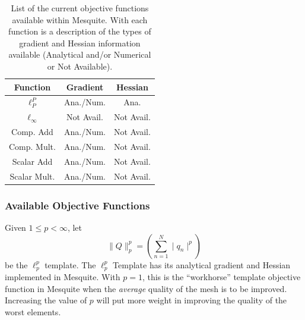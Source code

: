 \begin{table}[htb]
\begin{center}
\begin{tabular}{|c|c|c|}
\hline
Function & Gradient & Hessian\\
\hline
$\ell_P^P$     & Ana./Num.&Ana.\\
$\ell_{\infty}$& Not Avail.& Not Avail.\\
Comp. Add      & Ana./Num.& Not Avail.\\
Comp. Mult.    & Ana./Num.& Not Avail.\\
Scalar Add     & Ana./Num.& Not Avail.\\
Scalar Mult.   & Ana./Num.& Not Avail.\\
\hline
\end{tabular}
\caption{List of the current objective functions available within
Mesquite.  With each function is a description of the types of
gradient and Hessian information available (Analytical and/or Numerical
or Not Available).}
\label{current-objfunc}
\end{center}
\end{table}

\subsubsection{Available Objective Functions}


 \newline
Given $1 \leq p < \infty$, let 
\begin{equation}
\| Q \|_p^p = ( \sum_{n=1}^N \mid q_n \mid^p )
\end{equation}
be the 
$\ell_p^p$ template. The $\ell_p^p$ Template has its analytical gradient and Hessian implemented in
Mesquite. With $p=1$, this is the ``workhorse'' template objective function in Mesquite when the \emph{average}
quality of the mesh is to be improved. Increasing the value of $p$ will put more weight in improving
the quality of the worst elements. 
\newline

